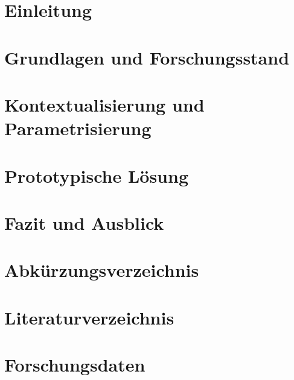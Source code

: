 \documentclass[headings=small,a4paper,11pt,oneside,listof=numbered]{scrreprt}
\begin{document}
\singlespacing

\maketitle

\singlespacing
\tableofcontents
\restoregeometry

\singlespacing
\chapter{Einleitung}


\singlespacing 
\chapter{Grundlagen und Forschungsstand}


\singlespacing
\chapter{Kontextualisierung und Parametrisierung}


\singlespacing 
\chapter{Prototypische Lösung}


\singlespacing 
\chapter{Fazit und Ausblick}


\singlespacing 
\appendix
\chapter{Abkürzungsverzeichnis}


\listoffigures

\chapter{Literaturverzeichnis}
\nocite{*}
\onehalfspacing
\printbibliography[heading=none]

\chapter{Forschungsdaten}

\end{document}
